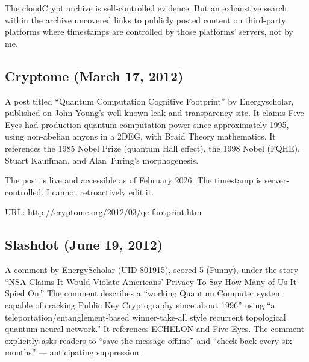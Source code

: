 
The cloudCrypt archive is self-controlled evidence. But an exhaustive search within the archive uncovered links to publicly posted content on third-party platforms where timestamps are controlled by those platforms' servers, not by me.

\subsection*{Cryptome (March 17, 2012)}
\label{pos34:cryptome-march-17-2012}

A post titled ``Quantum Computation Cognitive Footprint'' by Energyscholar, published on John Young's well-known leak and transparency site. It claims Five Eyes had production quantum computation power since approximately 1995, using non-abelian anyons in a 2DEG, with Braid Theory mathematics. It references the 1985 Nobel Prize (quantum Hall effect), the 1998 Nobel (FQHE), Stuart Kauffman, and Alan Turing's morphogenesis.

The post is live and accessible as of February 2026. The timestamp is server-controlled. I cannot retroactively edit it.

URL: \url{http://cryptome.org/2012/03/qc-footprint.htm}

\subsection*{Slashdot (June 19, 2012)}
\label{pos34:slashdot-june-19-2012}

A comment by EnergyScholar (UID 801915), scored 5 (Funny), under the story ``NSA Claims It Would Violate Americans' Privacy To Say How Many of Us It Spied On.'' The comment describes a ``working Quantum Computer system capable of cracking Public Key Cryptography since about 1996'' using ``a teleportation/entanglement-based winner-take-all style recurrent topological quantum neural network.'' It references ECHELON and Five Eyes. The comment explicitly asks readers to ``save the message offline'' and ``check back every six months'' --- anticipating suppression.

